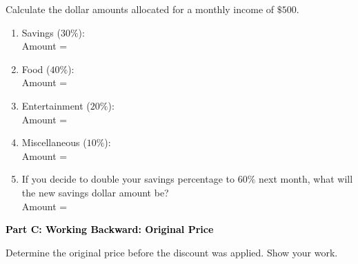 \documentclass[12pt, letterpaper, fleqn]{article}
\newcommand{\blanklong}{\underline{\hspace{6.5cm}}}
\begin{document}
\vspace{3mm}

\noindent
Calculate the dollar amounts allocated for a monthly income of $\$500$.

\vspace{5mm}

\begin{enumerate}[itemsep=2.2cm, leftmargin=0.6cm]
\item Savings ($30\%$): \\
Amount = \blanklong

\item Food ($40\%$): \\
Amount = \blanklong

\item Entertainment ($20\%$): \\
Amount = \blanklong

\item Miscellaneous ($10\%$): \\
Amount = \blanklong

\item If you decide to double your savings percentage to $60\%$ next month, what will the new savings dollar amount be? \\
Amount = \blanklong
\end{enumerate}

\newpage

\begin{tcolorbox}[colback=black!10]
    \large\textcolor{black}{\textbf{Part C: Working Backward: Original Price}}
\end{tcolorbox}

\vspace{3mm}

\noindent
Determine the original price before the discount was applied. Show your work.

\vspace{5mm}
\end{document}
